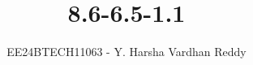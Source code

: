 \documentclass[journal]{IEEEtran}
\begin{document}

\vspace{3cm}

\title{8.6-6.5-1.1}
\author{EE24BTECH11063 - Y. Harsha Vardhan Reddy}
 \maketitle
{\let\newpage\relax\maketitle}

\renewcommand{\thefigure}{\theenumi}
\renewcommand{\thetable}{\theenumi}
\setlength{\intextsep}{10pt} %


\renewcommand{\thetable}{\theenumi}
\end{document}
